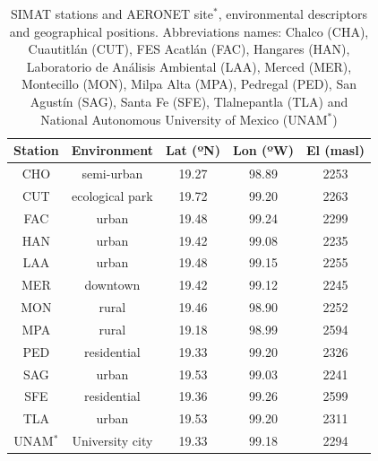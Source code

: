 \documentclass[journal=jacsat,manuscript=article]{achemso}
\begin{document}
\begin{table}[H]
  \centering
  \begin{tabular}{ccccc}
    \hline
    Station  & Environment     & Lat (ºN) & Lon (ºW) & El (masl) \\ \hline
    CHO      & semi-urban      & 19.27    & 98.89    & 2253      \\
    CUT      & ecological park & 19.72    & 99.20    & 2263      \\
    FAC      & urban           & 19.48    & 99.24    & 2299      \\
    HAN      & urban           & 19.42    & 99.08    & 2235      \\
    LAA      & urban           & 19.48    & 99.15    & 2255      \\
    MER      & downtown        & 19.42    & 99.12    & 2245      \\
    MON      & rural           & 19.46    & 98.90    & 2252      \\
    MPA      & rural           & 19.18    & 98.99    & 2594      \\
    PED      & residential     & 19.33    & 99.20    & 2326      \\
    SAG      & urban           & 19.53    & 99.03    & 2241      \\
    SFE      & residential     & 19.36    & 99.26    & 2599      \\
    TLA      & urban           & 19.53    & 99.20    & 2311      \\
    UNAM$^*$ & University city & 19.33    & 99.18    & 2294      \\\hline
  \end{tabular}
  \caption{{{{SIMAT stations and AERONET site$^*$, environmental descriptors and geographical
                positions. Abbreviations names: Chalco (CHA), Cuautitlán (CUT), FES Acatlán
                (FAC), Hangares (HAN), Laboratorio de Análisis Ambiental (LAA), Merced
                (MER), Montecillo (MON), Milpa Alta (MPA), Pedregal (PED), San Agustín
                (SAG), Santa Fe (SFE), Tlalnepantla (TLA) and National Autonomous University of Mexico (UNAM$^*$)}}}}
  \label{table:stations}
\end{table}
\end{document}
